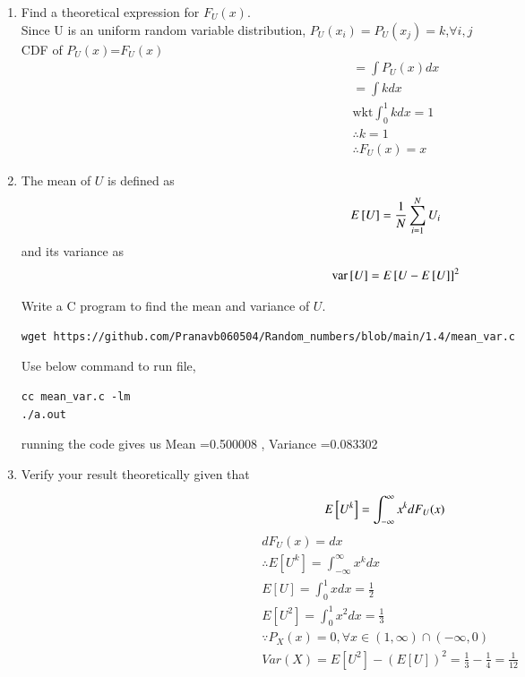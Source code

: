 \documentclass[journal,12pt,twocolumn]{IEEEtran}
\renewcommand\thesection{\arabic{section}}
\begin{document}
\begin{enumerate}[label=\thesection.\arabic*
,ref=\thesection.\theenumi]
%
\item
Find a  theoretical expression for $F_{U}(x)$.\\
\solution
Since U is an uniform random variable distribution, $P_{U}(x_{i})=P_{U}(x_{j})=k$,$\forall i,j$\\
	CDF of $P_{U}(x)$=$F_{U}(x)$\\
	\begin{align}
	=\int P_{U}(x) dx\\
	=\int k dx\\
  \text{wkt} \int_{0}^{1} kdx=1\\
  \therefore k=1\\
  \therefore F_{U}(x)=x
	\end{align}	
\item
The mean of $U$ is defined as
%
\begin{equation}
E{}\left[U\right] = \frac{1}{N}\sum_{i=1}^{N}U_i
\end{equation}
%
and its variance as
%
\begin{equation}
\text{var}{}\left[U\right] = E{}\left[U- E{}\left[U\right]\right]^2 
\end{equation}

Write a C program to  find the mean and variance of $U$. \\
\solution
\begin{lstlisting}
wget https://github.com/Pranavb060504/Random_numbers/blob/main/1.4/mean_var.c
\end{lstlisting}
Use below command to run file,
\begin{lstlisting}
cc mean_var.c -lm
./a.out
\end{lstlisting}
running the code gives us Mean =0.500008 , Variance =0.083302
\item Verify your result theoretically given that
\end{enumerate}
%
\begin{equation}
E{}\left[U^k\right] = \int_{-\infty}^{\infty}x^kdF_{U}(x)
\end{equation}
\begin{align}
&dF_{U}(x)=dx\\
&\therefore E[U^k]=\int_{-\infty}^{\infty} x^k dx\\
&E[U]=\int_{0}^{1} x dx=\frac{1}{2}\\
&E[U^2]=\int_{0}^{1} x^2 dx=\frac{1}{3}\\
&\because P_{X}(x)=0 ,\forall x \in (1,\infty)\cap (-\infty,0)\\
&Var(X)=E[U^2]-(E[U])^2=\frac{1}{3}-\frac{1}{4}=\frac{1}{12}
\end{align}
\end{document}

